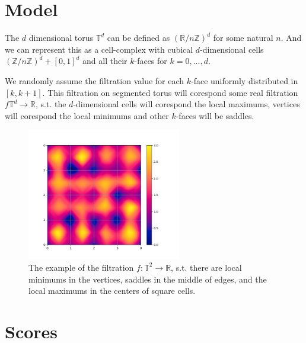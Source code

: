 \documentclass{article}
\begin{document}
\section{Model}
\par The $d$ dimensional torus $\mathbb{T}^d$ can be defined as $\left(\mathbb{R}/n\mathbb{Z}\right)^d$ for some natural $n$. And we can represent this as a cell-complex with cubical $d$-dimensional cells $\left(\mathbb{Z}/n\mathbb{Z}\right)^d + [0, 1]^d$ and all their $k$-faces for $k=0, ..., d$.
\par We randomly assume the filtration value for each $k$-face uniformly distributed in $[k, k+1]$. This filtration on segmented torus will corespond some real filtration $f\mathbb{T}^d\to\mathbb{R}$, s.t. the $d$-dimensional cells will corespond the local maximums, vertices will corespond the local minimums and other $k$-faces will be saddles.
\begin{figure}[h!]
    \centering
    \includegraphics[width=0.6\textwidth]{pics/torus scores/2d-example.png}
    \caption{The example of the filtration $f:\mathbb{T}^2\to\mathbb{R}$, s.t. there are local minimums in the vertices, saddles in the middle of edges, and the local maximums in the centers of square cells.}
    \label{fig:example2d}
\end{figure}

\section{Scores}
\end{document}
